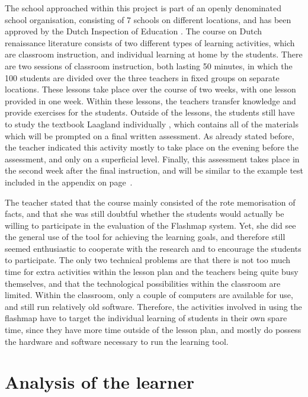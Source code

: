 The school approached within this project is part of an openly denominated school organisation, consisting of 7 schools on different locations, and has been approved by the Dutch Inspection of Education \cite{inspectierapport}. The course on Dutch renaissance literature consists of two different types of learning activities, which are classroom instruction, and individual learning at home by the students. There are two sessions of classroom instruction, both lasting 50 minutes, in which the 100 students are divided over the three teachers in fixed groups on separate locations. These lessons take place over the course of two weeks, with one lesson provided in one week. Within these lessons, the teachers transfer knowledge and provide exercises for the students. Outside of the lessons, the students still have to study the textbook Laagland individually \cite{laagland}, which contains all of the materials which will be prompted on a final written assessment. As already stated before, the teacher indicated this activity mostly to take place on the evening before the assessment, and only on a superficial level. Finally, this assessment takes place in the second week after the final instruction, and will be similar to the example test included in the appendix on page~\pageref{app:exampletest}.

The teacher stated that the course mainly consisted of the rote memorisation of facts, and that she was still doubtful whether the students would actually be willing to participate in the evaluation of the Flashmap system. Yet, she did see the general use of the tool for achieving the learning goals, and therefore still seemed enthusiastic to cooperate with the research and to encourage the students to participate. The only two technical problems are that there is not too much time for extra activities within the lesson plan and the teachers being quite busy themselves, and that the technological possibilities within the classroom are limited. Within the classroom, only a couple of computers are available for use, and still run relatively old software. Therefore, the activities involved in using the flashmap have to target the individual learning of students in their own spare time, since they have more time outside of the lesson plan, and mostly do possess the hardware and software necessary to run the learning tool.

\section{Analysis of the learner}
\label{sec:learneranalysis}

